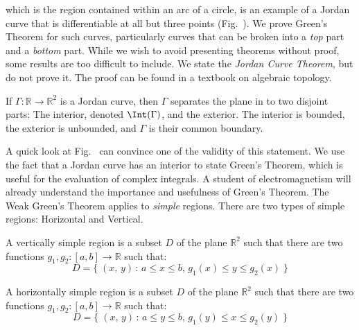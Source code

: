     which is the region contained within an arc of a circle, is an example
    of a Jordan curve that is differentiable at all but three points
    (Fig.~). We prove Green's
    Theorem for such curves, particularly curves that can be broken into a
    \textit{top} part and a \textit{bottom} part. While we wish to avoid
    presenting theorems without proof, some results are too difficult to
    include. We state the \textit{Jordan Curve Theorem}, but do not prove
    it. The proof can be found in a textbook on algebraic topology.
    \begin{theorem}
        If $\Gamma:\mathbb{R}\rightarrow\mathbb{R}^{2}$ is a Jordan curve,
        then $\Gamma$ separates the plane in to two disjoint parts: The
        interior, denoted $\Int(\Gamma)$, and the exterior. The interior
        is bounded, the exterior is unbounded, and
        $\Gamma$ is their common boundary.
    \end{theorem}
    A quick look at Fig.~ can
    convince one of the validity of this statement. We use the fact that a
    Jordan curve has an interior to state Green's Theorem, which is useful
    for the evaluation of complex integrals. A student of electromagnetism
    will already understand the importance and usefulness of Green's
    Theorem. The Weak Green's Theorem applies to \textit{simple} regions.
    There are two types of simple regions: Horizontal and Vertical.
    \begin{definition}
        A vertically simple region is a subset $D$ of
        the plane $\mathbb{R}^{2}$ such that there are
        two functions
        $g_{1},g_{2}:[a,b]\rightarrow\mathbb{R}$ such that:
        \begin{equation}
            D=\{\;(x,\,y)\,:\,a\leq{x}\leq{b},\,
                              g_{1}(x)\leq{y}\leq{g}_{2}(x)\;\}
        \end{equation}
    \end{definition}
    \begin{definition}
        A horizontally simple region is a subset $D$
        of the plane
        $\mathbb{R}^{2}$ such that there are two functions
        $g_{1},g_{2}:[a,b]\rightarrow\mathbb{R}$ such that:
        \begin{equation}
            D=\{\;(x,\,y)\,:\,a\leq{y}\leq{b},\,
                              g_{1}(y)\leq{x}\leq{g}_{2}(y)\;\}
        \end{equation}
    \end{definition}
